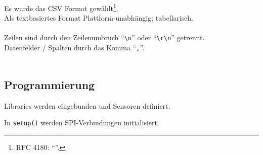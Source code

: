 \documentclass[ngerman]{schoolPres}
\begin{document}
  \begin{frame}[fragile]
    Es wurde das CSV Format gewählt\footnote{RFC 4180: \enquote{}\cite{rfc4180}.}.\\
    Als textbasiertes Format Plattform-unabhängig; tabellarisch.\\~\\

    Zeilen sind durch den Zeilenumbruch \enquote{\texttt{\textbackslash n}} oder \enquote{\texttt{\textbackslash r\textbackslash n}} getrennt.\\
    Datenfelder / Spalten durch das Komma \enquote{\texttt{,}}.\\~\\

    

  \end{frame}

  \subsection{Programmierung}
  \begin{frame}[fragile]
    Libraries werden eingebunden und Sensoren definiert.\\
    
  \end{frame}

  \begin{frame}[fragile]
    In \texttt{setup()} werden SPI-Verbindungen initialisiert.\\
    
  \end{frame}
\end{document}

